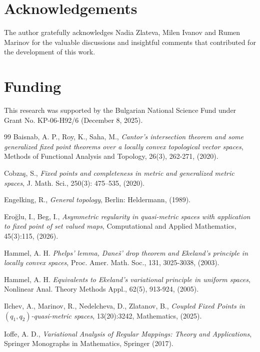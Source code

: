 \documentclass{article}
\begin{document}
\section*{Acknowledgements}
The author gratefully acknowledges Nadia Zlateva, Milen Ivanov and Rumen Marinov for the valuable discussions and insightful comments that contributed for the development of this work.


\section*{Funding}
This research was supported by the Bulgarian National Science Fund under Grant No. KP-06-H92/6 (December 8, 2025).



\begin{thebibliography}{99}
 Baisnab, A. P., Roy, K., Saha, M.,
\textit{Cantor's intersection theorem and some generalized fixed point theorems over a locally convex topological vector spaces},
 Methods of Functional Analysis and Topology, 26(3), 262-271, (2020). 

 Cobza\c{s}, S., \textit{Fixed points and completeness in metric and generalized metric spaces}, J. Math. Sci., 250(3): 475--535, (2020).

Engelking, R., \textit{General topology}, Berlin: Heldermann, (1989).

 Eroğlu, I., Beg, I., \textit{Asymmetric regularity in quasi-metric spaces with application to fixed point of set valued maps}, Computational and Applied Mathematics, 45(3):115, (2026).

Hammel, A. H. \textit{Phelps’ lemma, Dane\v{s}’ drop theorem and Ekeland’s principle in locally convex spaces}, Proc. Amer. Math. Soc., 131, 3025-3038, (2003).

Hammel, A. H. \textit{Equivalents to Ekeland's variational principle in uniform spaces}, Nonlinear Anal. Theory Methods Appl., 62(5), 913-924, (2005).

 Ilchev, A., Marinov, R., Nedelcheva, D., Zlatanov, B., \textit{Coupled Fixed Points in $(q_1, q_2)$-quasi-metric spaces}, 13(20):3242,  Mathematics, (2025).

 Ioffe, A. D., \textit{ Variational Analysis of Regular Mappings: Theory and Applications}, Springer Monographs
in Mathematics, Springer (2017).


\end{thebibliography}
\end{document}
